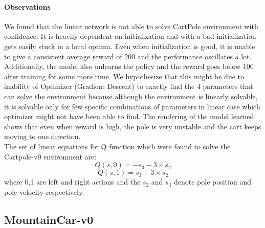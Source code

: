 \documentclass[12pt]{article}
\begin{document}
\paragraph{Observations} We found that the linear network is not able to solve CartPole environment with confidence. It is heavily dependent on initialization and with a bad initialization gets easily stuck in a local optima. Even when initialization is good, it is unable to give a consistent average reward of 200 and the performance oscillates a lot. Additionally, the model also unlearns the policy and the reward goes below 100 after training for some more time. We hypothesize that this might be due to inability of Optimizer (Gradient Descent) to exactly find the 4 parameters that can solve the environment because although the environment is linearly solvable, it is solvable only for few specific combinations of parameters in linear case which optimizer might not have been able to find. The rendering of the model learned shows that even when reward is high, the pole is very unstable and the cart keeps moving to one direction.\\
The set of linear equations for Q function which were found to solve the Cartpole-v0 environment are:
$$ Q(s,0) = -s_3 - 3 \times s_2 $$
$$ Q(s,1) = s_3 + 3 \times s_2 $$
where 0,1 are left and right actions and the $s_2$ and $s_3$ denote pole position and pole velocity respectively.




\pagebreak[4]
\subsection*{MountainCar-v0}
\end{document}
